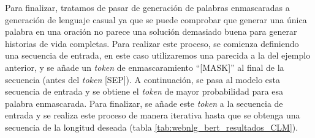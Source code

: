 Para finalizar, tratamos de pasar de generación de palabras enmascaradas a generación de lenguaje casual ya que se puede comprobar que generar una única palabra en una oración no parece una solución demasiado buena para generar historias de vida completas. Para realizar este proceso, se comienza definiendo una secuencia de entrada, en este caso utilizaremos una parecida a la del ejemplo anterior, y se añade un \textit{token} de enmascaramiento ``[MASK]'' al final de la secuencia (antes del \textit{token} [SEP]). A continuación, se pasa al modelo esta secuencia de entrada y se obtiene el \textit{token} de mayor probabilidad para esa palabra enmascarada. Para finalizar, se añade este \textit{token} a la secuencia de entrada y se realiza este proceso de manera iterativa hasta que se obtenga una secuencia de la longitud deseada (tabla \ref{tab:webnlg_bert_resultados_CLM}).



